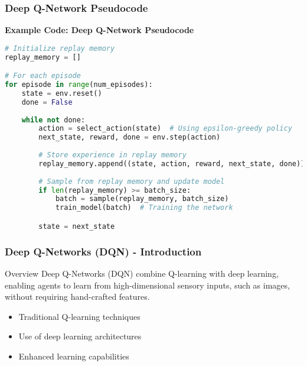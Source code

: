 \documentclass[aspectratio=169]{beamer}
\begin{document}
\begin{frame}[fragile]
    \frametitle{Deep Q-Network Pseudocode}
    \textbf{Example Code: Deep Q-Network Pseudocode} \\
    \begin{lstlisting}[language=Python]
# Initialize replay memory
replay_memory = []

# For each episode
for episode in range(num_episodes):
    state = env.reset()
    done = False
    
    while not done:
        action = select_action(state)  # Using epsilon-greedy policy
        next_state, reward, done = env.step(action)  
        
        # Store experience in replay memory
        replay_memory.append((state, action, reward, next_state, done))
        
        # Sample from replay memory and update model
        if len(replay_memory) >= batch_size:
            batch = sample(replay_memory, batch_size)
            train_model(batch)  # Training the network

        state = next_state
    \end{lstlisting}
\end{frame}

\begin{frame}[fragile]
    \frametitle{Deep Q-Networks (DQN) - Introduction}
    \begin{block}{Overview}
        Deep Q-Networks (DQN) combine Q-learning with deep learning, enabling agents to learn from high-dimensional sensory inputs, such as images, without requiring hand-crafted features.
    \end{block}
    \begin{itemize}
        \item Traditional Q-learning techniques
        \item Use of deep learning architectures
        \item Enhanced learning capabilities
    \end{itemize}
\end{frame}
\end{document}
